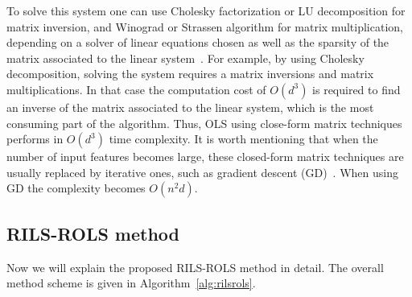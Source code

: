 \documentclass{bmcart}
\begin{document}
To solve this system one can use Cholesky  factorization or LU decomposition for matrix inversion, and Winograd or Strassen algorithm for matrix multiplication, depending on a solver of linear equations chosen as well as the sparsity of the matrix associated to the linear system~\cite{krishnamoorthy2013matrix}. For example, by using Cholesky decomposition, solving the system requires a matrix inversions and matrix multiplications. In that case the computation cost of $O(d^3)$ is required to find an inverse of the matrix associated to the linear system, which is the most consuming part of the algorithm. Thus, OLS using close-form matrix techniques performs in $O(d^3)$ time complexity.  %
It is worth mentioning that when the number of input features becomes large, these closed-form matrix techniques are usually replaced by iterative ones, such as gradient descent (GD)~\cite{andrychowicz2016learning}. When using GD the complexity becomes $O(n^2d )$.


\subsection{\textsc{RILS}-\textsc{ROLS}  method}
Now we will explain the proposed \textsc{RILS}-\textsc{ROLS} method in detail. The overall method scheme is given in Algorithm~\ref{alg:rilsrols}.   
\end{document}
